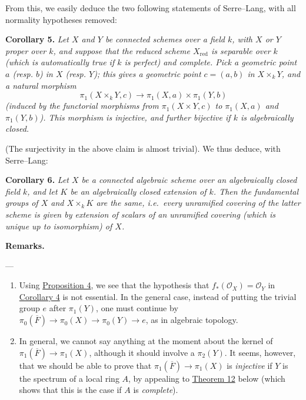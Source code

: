 \documentclass{article}
\newenvironment{itenv}[1]
  {\phantomsection\par\smallskip\noindent\textbf{#1.}\itshape}
  {\par\smallskip}
\newenvironment{rmenv}[1]
  {\phantomsection\par\smallskip\noindent\textbf{#1.}\rmfamily}
  {\par\smallskip}
\newcommand{\oldpage}[1]{\marginpar{\footnotesize$\Big\vert$ \textit{p.~#1}}}
\theoremstyle{definition}
\theoremstyle{definition}
\theoremstyle{definition}
\theoremstyle{definition}
\theoremstyle{remark}
\begin{document}
From this, we easily deduce the two following statements of Serre--Lang, with all normality hypotheses removed:

\leavevmode{}%
\begin{itenv}{Corollary 5}
Let \(X\) and \(Y\) be connected schemes over a field \(k\), with \(X\) or \(Y\) proper over \(k\), and suppose that the reduced scheme \(X_\mathrm{red}\) is separable over \(k\) (which is automatically true if \(k\) is perfect) and complete.
Pick a geometric point \(a\) (resp. \(b\)) in \(X\) (resp. \(Y\)); this gives a geometric point \(c=(a,b)\) in \(X\times_kY\), and a natural morphism
\[
  \pi_1(X\times_kY,c) \to \pi_1(X,a)\times\pi_1(Y,b)
\]
(induced by the functorial morphisms from \(\pi_1(X\times Y,c)\) to \(\pi_1(X,a)\) and \(\pi_1(Y,b)\)).
This morphism is injective, and further bijective if \(k\) is algebraically closed.

\end{itenv}

(The surjectivity in the above claim is almost trivial).
We thus deduce, with Serre--Lang:

\leavevmode{}%
\begin{itenv}{Corollary 6}
Let \(X\) be a connected algebraic scheme over an algebraically closed field \(k\), and let \(K\) be an algebraically closed extension of \(k\).
Then the fundamental groups of \(X\) and \(X\times_kK\) are the same, i.e.~every unramified covering of the latter scheme is given by extension of scalars of an unramified covering (which is unique up to isomorphism) of \(X\).

\end{itenv}

\begin{rmenv}{Remarks}

---

\begin{enumerate}
\def\labelenumi{\arabic{enumi}.}
\item
  Using \protect\hyperlink{fga-2-proposition-4}{Proposition 4}, we see that the hypothesis that \(f_*({\mathscr{O}}_X)={\mathscr{O}}_Y\) in \protect\hyperlink{fga-2-theorem-11-corollary-4}{Corollary 4} is not essential.
  In the general case, instead of putting the trivial group \(e\) after \(\pi_1(Y)\), one must continue by \(\pi_0(\overline{F})\to\pi_0(X)\to\pi_0(Y)\to e\),
  as in algebraic topology.
\item
  \oldpage{182-24}In general, we cannot say anything at the moment about the kernel of \(\pi_1(\overline{F})\to\pi_1(X)\), although it should involve a \(\pi_2(Y)\).
  It seems, however, that we should be able to prove that \(\pi_1(\overline{F})\to\pi_1(X)\) is \emph{injective} if \(Y\) is the spectrum of a local ring \(A\), by appealing to \protect\hyperlink{fga-2-theorem-12}{Theorem 12} below (which shows that this is the case if \(A\) is \emph{complete}).
\end{enumerate}

\end{rmenv}
\end{document}
